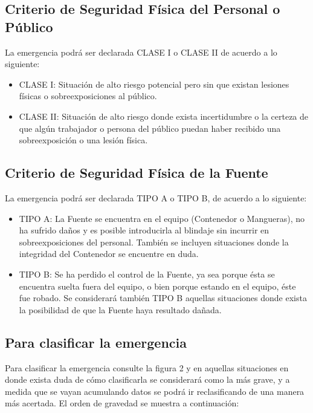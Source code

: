 \subsection*{Criterio de Seguridad Física del Personal o Público}
La emergencia podrá ser declarada CLASE I o CLASE II de acuerdo a lo siguiente:
\begin{itemize}
    \item CLASE I: Situación de alto riesgo potencial pero sin que existan lesiones físicas o sobreexposiciones al público.
    \item CLASE II: Situación de alto riesgo donde exista incertidumbre o la certeza de que algún trabajador o persona del público puedan haber recibido una sobreexposición o una lesión física.
\end{itemize}

\subsection*{Criterio de Seguridad Física de la Fuente}
La emergencia podrá ser declarada TIPO A o TIPO B, de acuerdo a lo siguiente:
\begin{itemize}
    \item TIPO A: La Fuente se encuentra en el equipo (Contenedor o Mangueras), no ha sufrido daños y es posible introducirla al blindaje sin incurrir en sobreexposiciones del personal. También se incluyen situaciones donde la integridad del Contenedor se encuentre en duda.
    \item TIPO B: Se ha perdido el control de la Fuente, ya sea porque ésta se encuentra suelta fuera del equipo, o bien porque estando en el equipo, éste fue robado. Se considerará también TIPO B aquellas situaciones donde exista la posibilidad de que la Fuente haya resultado dañada.
\end{itemize}

\subsection*{Para clasificar la emergencia}
Para clasificar la emergencia consulte la figura 2 y en aquellas situaciones en donde exista duda de cómo clasificarla se considerará como la más grave, y a medida que se vayan acumulando datos se podrá ir reclasificando de una manera más acertada. El orden de gravedad se muestra a continuación:
